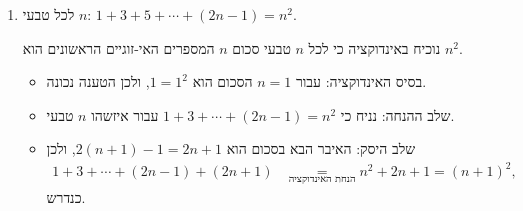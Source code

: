 \begin{enumerate}
\item
לכל טבעי
$n$:
$1+3+5+\cdots+(2n-1)=n^2$.
\begin{solbox}
נוכיח באינדוקציה כי לכל
$n$
טבעי סכום
$n$
המספרים האי-זוגיים הראשונים הוא
$n^2$.
\begin{itemize}
\item
בסיס האינדוקציה: עבור
$n=1$
הסכום הוא
$1=1^2$,
ולכן הטענה נכונה.
\item
שלב ההנחה: נניח כי
$1+3+\cdots+(2n-1)=n^2$
עבור איזשהו
$n$
טבעי.
\item
שלב היסק: האיבר הבא בסכום הוא
$2(n+1)-1=2n+1$,
ולכן
\begin{align*}
1+3+\cdots+(2n-1)+(2n+1)&\underset{\text{הנחת האינדוקציה}}{=}n^2+2n+1=(n+1)^2,
\end{align*}
כנדרש.
\end{itemize}
\end{solbox}
\end{enumerate}
